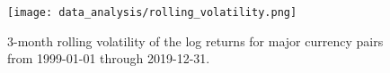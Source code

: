 \begin{figure}
    \begin{center}
        \texttt{[image: data\_analysis/rolling\_volatility.png]}
    \end{center}
    \caption{3-month rolling volatility of the log returns for major currency pairs from 1999-01-01 through 2019-12-31.}
    \label{fig:rolling_volatility}
\end{figure}
